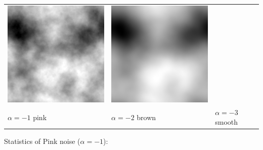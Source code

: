 \begin{tabular}{lll}
	\includegraphics{brown.png} &
	\includegraphics{smooth.png} \\
	$\alpha=-1$ pink &
	$\alpha=-2$ brown &
	$\alpha=-3$ smooth  \\
\end{tabular}


Statistics of Pink noise ($\alpha=-1$):

